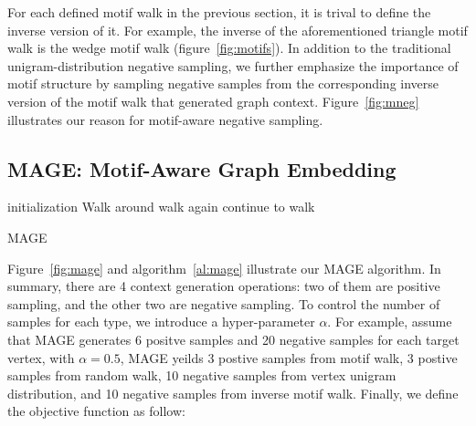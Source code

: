\documentclass[letterpaper]{article}
\begin{document}
            For each defined motif walk in the previous section, it is trival to define the inverse version
            of it. For example, the inverse of the aforementioned triangle motif walk is the wedge motif
            walk (figure~\ref{fig:motifs}). In addition to the traditional unigram-distribution negative
            sampling, we further emphasize the importance of motif structure by sampling negative samples
            from the corresponding inverse version of the motif walk that generated graph context. 
            Figure~\ref{fig:mneg} illustrates our reason for motif-aware negative sampling.


        \subsection{MAGE: Motif-Aware Graph Embedding}

            \begin{algorithm}
                \DontPrintSemicolon
                initialization\;
                 {
                    Walk around\;
                     {
                        walk again\;
                    } {
                        continue to walk\;
                    }
                }
                \caption{MAGE}
                \label{al:mage}
            \end{algorithm}

            Figure~\ref{fig:mage} and algorithm~\ref{al:mage} illustrate our MAGE algorithm. In summary, 
            there are 4 context generation operations: two of them are positive sampling, and the other
            two are negative sampling. To control the number of samples for each type, we introduce a 
            hyper-parameter $\alpha$. For example, assume that MAGE generates 6 positve samples and 
            20 negative samples for each target vertex, with $\alpha=0.5$, MAGE yeilds 3 postive samples 
            from motif walk, 3 postive samples from random walk, 10 negative samples from vertex unigram
            distribution, and 10 negative samples from inverse motif walk.  Finally, we define the 
            objective function as follow:

\end{document}
